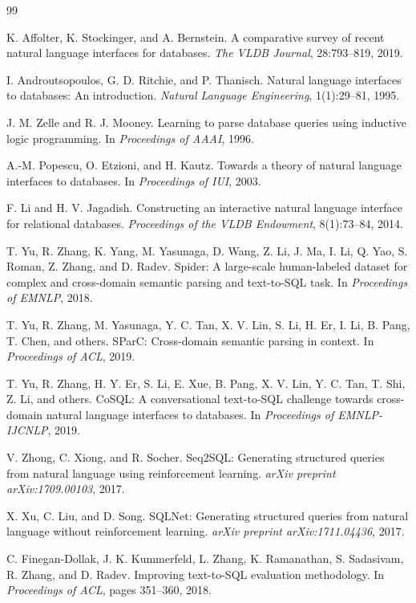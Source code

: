 \documentclass[11pt]{article}
\begin{document}
\begin{thebibliography}{99}

K. Affolter, K. Stockinger, and A. Bernstein.
A comparative survey of recent natural language interfaces for databases.
\emph{The VLDB Journal}, 28:793--819, 2019.

I. Androutsopoulos, G. D. Ritchie, and P. Thanisch.
Natural language interfaces to databases: An introduction.
\emph{Natural Language Engineering}, 1(1):29--81, 1995.

J. M. Zelle and R. J. Mooney.
Learning to parse database queries using inductive logic programming.
In \emph{Proceedings of AAAI}, 1996.

A.-M. Popescu, O. Etzioni, and H. Kautz.
Towards a theory of natural language interfaces to databases.
In \emph{Proceedings of IUI}, 2003.

F. Li and H. V. Jagadish.
Constructing an interactive natural language interface for relational databases.
\emph{Proceedings of the VLDB Endowment}, 8(1):73--84, 2014.

T. Yu, R. Zhang, K. Yang, M. Yasunaga, D. Wang, Z. Li, J. Ma, I. Li, Q. Yao, S. Roman, Z. Zhang, and D. Radev.
Spider: A large-scale human-labeled dataset for complex and cross-domain semantic parsing and text-to-SQL task.
In \emph{Proceedings of EMNLP}, 2018.

T. Yu, R. Zhang, M. Yasunaga, Y. C. Tan, X. V. Lin, S. Li, H. Er, I. Li, B. Pang, T. Chen, and others.
SParC: Cross-domain semantic parsing in context.
In \emph{Proceedings of ACL}, 2019.

T. Yu, R. Zhang, H. Y. Er, S. Li, E. Xue, B. Pang, X. V. Lin, Y. C. Tan, T. Shi, Z. Li, and others.
CoSQL: A conversational text-to-SQL challenge towards cross-domain natural language interfaces to databases.
In \emph{Proceedings of EMNLP-IJCNLP}, 2019.

V. Zhong, C. Xiong, and R. Socher.
Seq2SQL: Generating structured queries from natural language using reinforcement learning.
\emph{arXiv preprint arXiv:1709.00103}, 2017.

X. Xu, C. Liu, and D. Song.
SQLNet: Generating structured queries from natural language without reinforcement learning.
\emph{arXiv preprint arXiv:1711.04436}, 2017.

C. Finegan-Dollak, J. K. Kummerfeld, L. Zhang, K. Ramanathan, S. Sadasivam, R. Zhang, and D. Radev.
Improving text-to-SQL evaluation methodology.
In \emph{Proceedings of ACL}, pages 351--360, 2018.


\end{thebibliography}
\end{document}
